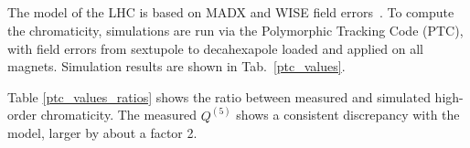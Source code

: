 
\subsection{}
\label{sec:nl_chroma_model}

The model of the LHC is based on MADX and WISE field errors~\cite{p_hagen_wise_2006}. To compute the
chromaticity, simulations are run via the Polymorphic Tracking Code (PTC), with field errors from
sextupole to decahexapole loaded and applied on all magnets. Simulation results are shown in Tab.~\ref{ptc_values}.

Table \ref{ptc_values_ratios} shows the ratio between measured and simulated high-order chromaticity. The measured $Q^{(5)}$ shows a consistent discrepancy with the model, larger by about a factor 2.

